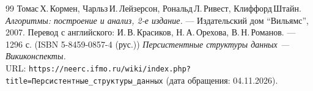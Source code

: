 \begin{thebibliography}{99}
Томас\,Х.\,Кормен, Чарльз\,И.\,Лейзерсон, Рональд\,Л.\,Ривест, Клиффорд\,Штайн.
{\itshape Алгоритмы: построение и анализ, 2-е издание.} --- Издательский дом \enquote{Вильямс}, 2007. Перевод с английского: И.\,В.\,Красиков, Н.\,А.\,Орехова, В.\,Н.\,Романов. --- 1296 с. (ISBN 5-8459-0857-4 (рус.))
{\itshape Персистентные структуры данных --- Викиконспекты.}
\\URL: \texttt{https://neerc.ifmo.ru/wiki/index.php?title=Персистентные\_структуры\_данных} (дата обращения: 04.11.2026).
\end{thebibliography}
\pagebreak
